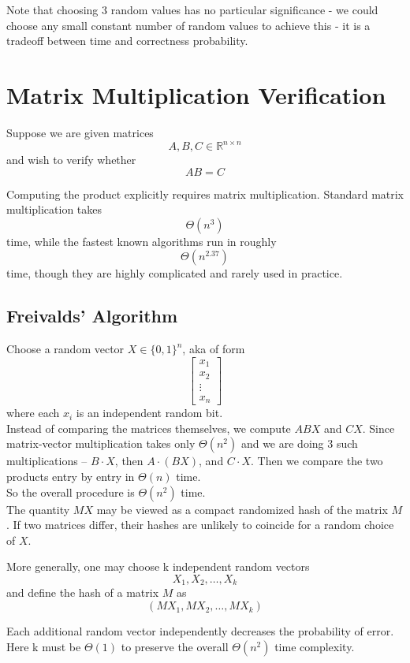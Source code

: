 \documentclass[11pt,openany]{book}
\begin{document}
Note that choosing 3 random values has no particular significance - we could choose any small
constant number of random values to achieve this - it is a tradeoff between time and correctness probability.

\section{Matrix Multiplication Verification}

Suppose we are given matrices
\[
A,B,C\in\mathbb{R}^{n\times n}
\]
and wish to verify whether
\[
AB=C
\]

Computing the product explicitly requires matrix multiplication. Standard matrix multiplication takes
\[
\Theta(n^3)
\]
time, while the fastest known algorithms run in roughly
\[
\Theta(n^{2.37})
\]
time, though they are highly complicated and rarely used in practice. \\


\subsection{Freivalds' Algorithm}

Choose a random vector $X\in\{0,1\}^n$, aka of form \[\begin{bmatrix}
x_1\\
x_2\\
\vdots\\
x_n
\end{bmatrix}\] where each $x_i$ is an independent random bit. \\

Instead of comparing the matrices themselves, we compute $ABX$ and $CX$. Since matrix-vector 
multiplication takes only $\Theta(n^2)$ and we are doing 3 
such multiplications -- $B\cdot X$, then $A\cdot(BX)$, and $C\cdot X$.
Then we compare the two products entry by entry in $\Theta(n)$ time. \\

So the overall procedure is $\Theta(n^2)$ time. \\

The quantity \(MX\) may be viewed as a compact randomized hash of the matrix \(M\). If two matrices differ, 
their hashes are unlikely to coincide for a random choice of \(X\).

More generally, one may choose k independent random vectors
\[
X_1,X_2,\dots,X_k
\]
and define the hash of a matrix \(M\) as
\[
(MX_1,MX_2,\dots,MX_k)
\]

Each additional random vector independently decreases the probability of error.
Here k must be $\Theta(1)$ to preserve the overall $\Theta(n^2)$ time complexity.
\end{document}
